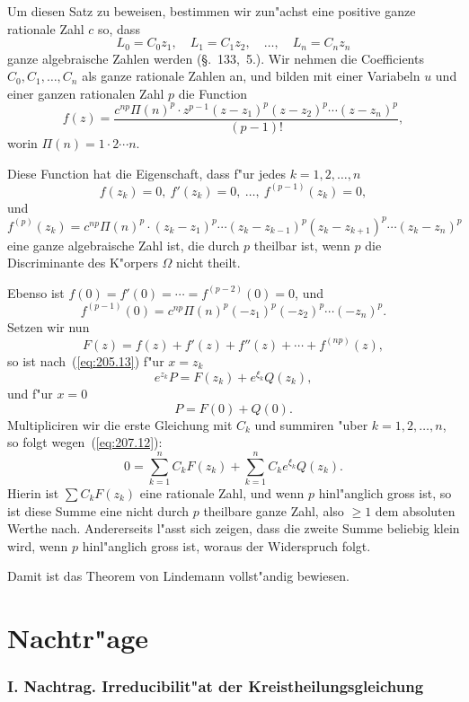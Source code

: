\documentclass[10pt,a4paper]{article}
\theoremstyle{weberstyle}
\begin{document}
Um diesen Satz zu beweisen, bestimmen wir zun"achst eine positive ganze
rationale Zahl $c$ so, dass
\begin{equation}\label{eq:207.14}
L_0 = C_0z_1,\quad L_1 = C_1z_2,\quad\dots,\quad L_n = C_nz_n
\end{equation}
ganze algebraische Zahlen werden (\S.~133,~5.). Wir nehmen die
Coefficients $C_0,C_1,\dots,C_n$ als ganze rationale Zahlen an, und bilden
mit einer Variabeln $u$ und einer ganzen rationalen Zahl $p$ die Function
\begin{equation}\label{eq:207.15}
f(z) = \frac{c^{np}\Pi(n)^p\cdot z^{p-1}(z-z_1)^p(z-z_2)^p\cdots(z-z_n)^p}
{(p-1)!},
\end{equation}
worin $\Pi(n)=1\cdot 2\cdots n$.

Diese Function hat die Eigenschaft, dass f"ur jedes $k=1,2,\dots,n$
\[
f(z_k)=0,\ f'(z_k)=0,\ \dots,\ f^{(p-1)}(z_k)=0,
\]
und
\[
f^{(p)}(z_k)=c^{np}\Pi(n)^p\cdot(z_k-z_1)^p\cdots(z_k-z_{k-1})^p
(z_k-z_{k+1})^p\cdots(z_k-z_n)^p
\]
eine ganze algebraische Zahl ist, die durch $p$ theilbar ist, wenn $p$
die Discriminante des K"orpers $\Omega$ nicht theilt.

Ebenso ist $f(0)=f'(0)=\cdots=f^{(p-2)}(0)=0$, und
\[
f^{(p-1)}(0) = c^{np}\Pi(n)^p(-z_1)^p(-z_2)^p\cdots(-z_n)^p.
\]
Setzen wir nun
\[
F(z) = f(z) + f'(z) + f''(z) + \cdots + f^{(np)}(z),
\]
so ist nach~(\ref{eq:205.13}) f"ur $x=z_k$
\[
e^{z_k}P = F(z_k) + e^{\xi_k}Q(z_k),
\]
und f"ur $x=0$
\[
P = F(0) + Q(0).
\]
Multipliciren wir die erste Gleichung mit $C_k$ und summiren "uber
$k=1,2,\dots,n$, so folgt wegen~(\ref{eq:207.12}):
\[
0 = \sum_{k=1}^{n}C_kF(z_k) + \sum_{k=1}^{n}C_ke^{\xi_k}Q(z_k).
\]
Hierin ist $\sum C_kF(z_k)$ eine rationale Zahl, und wenn $p$ hinl"anglich
gross ist, so ist diese Summe eine nicht durch $p$ theilbare ganze Zahl,
also $\geq 1$ dem absoluten Werthe nach. Andererseits l"asst sich zeigen,
dass die zweite Summe beliebig klein wird, wenn $p$ hinl"anglich gross
ist, woraus der Widerspruch folgt.

Damit ist das Theorem von Lindemann vollst"andig bewiesen.

\newpage

%
%
\part*{Nachtr"age}

%
%
\section*{I. Nachtrag. Irreducibilit"at der Kreistheilungsgleichung}
\end{document}
